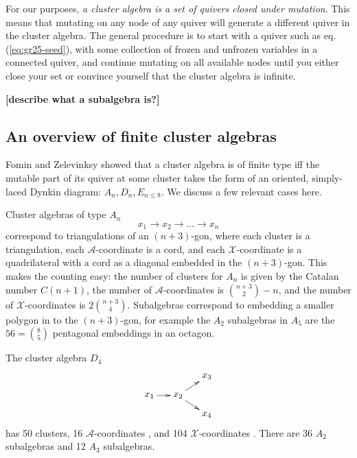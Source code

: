 \documentclass[11pt]{article}
\def\xcoord{$\mathcal{X}$-coordinate }
\def\xcoords{$\mathcal{X}$-coordinates }
\def\acoord{$\mathcal{A}$-coordinate }
\def\acoords{$\mathcal{A}$-coordinates }
\def\draftnote#1{{\bf [#1]}}
\begin{document}
For our purposes, \emph{a cluster algebra is a set of quivers closed under mutation}. This means that mutating on any node of any quiver will generate a different quiver in the cluster algebra. The general procedure is to start with a quiver such as eq. (\ref{eq:gr25-seed}), with some collection of frozen and unfrozen variables in a connected quiver, and continue mutating on all available nodes until you either close your set or convince yourself that the cluster algebra is infinite. 

\draftnote{describe what a subalgebra is?}

\subsection{An overview of finite cluster algebras}
Fomin and Zelevinksy \cite{1054.17024} showed that a cluster algebra is of finite type iff the mutable part of its quiver at some cluster takes the form of an oriented, simply-laced Dynkin diagram: $A_n, D_n, E_{n\le8}$. We discuss a few relevant cases here. 

Cluster algebras of type $A_n$ 
\begin{equation}\label{def:An}
  x_1\to x_2\to \ldots \to x_n
\end{equation}
correspond to triangulations of an $(n+3)$-gon, where each cluster is a triangulation, each \acoord is a cord, and each \xcoord is a quadrilateral with a cord as a diagonal embedded in the $(n+3)$-gon. This makes the counting easy: the number of clusters for $A_n$ is given by the Catalan number $C(n+1)$, the number of \acoords is $\binom{n+3}{2}-n$, and the number of \xcoords is $2\binom{n+3}{4}$. Subalgebras correspond to embedding a smaller polygon in to the $(n+3)$-gon, for example the $A_2$ subalgebras in $A_5$ are the $56=\binom{8}{5}$ pentagonal embeddings in an octagon. 

The cluster algebra $D_4$
\begin{equation}\label{def:D4}
    \begin{gathered}
    \begin{xy} 0;<1pt,0pt>:<0pt,-1pt>::
      (0,20) *+{x_1} ="1",
      (30,20) *+{x_2} ="2",
      (60,0) *+{x_3} ="3",
      (60,40) *+{x_4} ="4",
      "1", {\ar"2"},
      "2", {\ar"3"},
      "2", {\ar"4"},
    \end{xy}
    \end{gathered}
\end{equation}
has 50 clusters, 16 \acoords, and 104 \xcoords. There are 36 $A_2$ subalgebras and 12 $A_3$ subalgebras. 
\end{document}
